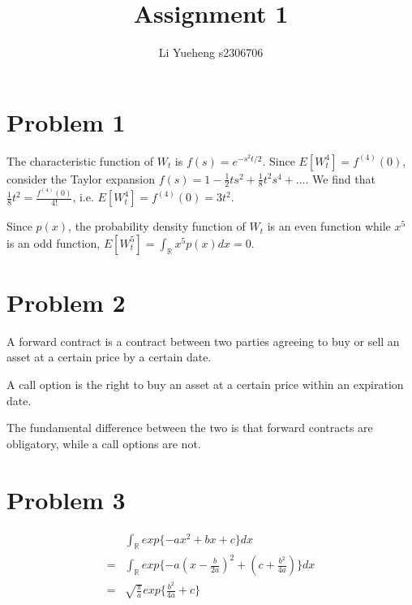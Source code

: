 \documentclass{article}
\begin{document}
\title{Assignment 1}
\author{Li Yueheng s2306706}

\maketitle

\section*{Problem 1}
The characteristic function of $W_t$ is $f(s)=e^{-s^2t/2}$. Since $E[W^4_t]=f^{(4)}(0)$, consider the Taylor expansion $f(s)=1-\frac{1}{2}ts^2+\frac{1}{8}t^2s^4+...$. We find that $\frac{1}{8}t^2=\frac{f^{(4)}(0)}{4!}$, i.e. $E[W^4_t]=f^{(4)}(0)=3t^2.$

Since $p(x)$, the probability density function of $W_t$ is an even function while $x^5$ is an odd function, $E[W^5_t]=\int_{\mathbb{R}}x^5p(x)dx=0.$

\section*{Problem 2}
A forward contract is a contract between two parties agreeing to buy or sell an asset at a certain price by a certain date. 

A call option is the right to buy an asset at a certain price within an expiration date.

The fundamental difference between the two is that forward contracts are obligatory, while a call options are not.


\section*{Problem 3}
\begin{align*}
	&\int_{\mathbb{R}}exp\{-ax^2+bx+c\}dx \\
	=&\int_{\mathbb{R}}exp\{-a(x-\frac{b}{2a})^2+(c+\frac{b^2}{4a})\}dx \\
	=&\sqrt{\frac{\pi}{a}}exp\{\frac{b^2}{4a}+c\}
\end{align*}
\end{document}
